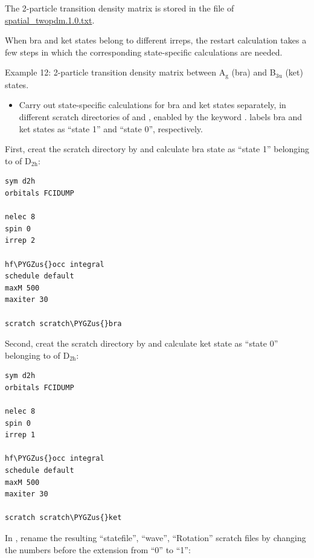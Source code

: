 \documentclass[letterpaper,10pt,english]{sphinxmanual}
\def\PYGZus{\char`\_}
\begin{document}
The 2-particle transition density matrix is stored in the file of
\href{https://raw.githubusercontent.com/sanshar/Block/master/README\_Examples/11/spatial\_twopdm.1.0.txt}{spatial\_twopdm.1.0.txt}.

When bra and ket states belong to different irreps, the restart calculation takes a few steps in which the corresponding state-specific calculations are needed.

Example 12: 2-particle transition density matrix between A$_{\text{g}}$ (bra) and B$_{\text{3u}}$ (ket) states.
\begin{itemize}
\item {} 
Carry out state-specific calculations for bra and ket states separately, in different scratch directories of  and , enabled by the keyword .  labels bra and ket states as ``state 1'' and ``state 0'', respectively.

\end{itemize}

First, creat the scratch directory by  and calculate bra state as ``state 1'' belonging to  of D$_{\text{2h}}$:

\begin{Verbatim}[commandchars=\\\{\}]
sym d2h
orbitals FCIDUMP

nelec 8
spin 0
irrep 2

hf\PYGZus{}occ integral
schedule default
maxM 500
maxiter 30

scratch scratch\PYGZus{}bra
\end{Verbatim}

Second, creat the scratch directory by  and calculate ket state as ``state 0'' belonging to  of D$_{\text{2h}}$:

\begin{Verbatim}[commandchars=\\\{\}]
sym d2h
orbitals FCIDUMP

nelec 8
spin 0
irrep 1

hf\PYGZus{}occ integral
schedule default
maxM 500
maxiter 30

scratch scratch\PYGZus{}ket
\end{Verbatim}

In , rename the resulting ``statefile'', ``wave'', ``Rotation'' scratch files by changing the numbers before the  extension from ``0'' to ``1'':
\end{document}
